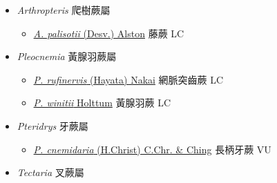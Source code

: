 
  \begin{itemize}
 \item[    ] \textit{Arthropteris} 爬樹蕨屬
                                
  \begin{itemize}
        \item[] \href{http://www.theplantlist.org/tpl1.1/search?q=Arthropteris+palisotii}{\textit{A. palisotii} (Desv.) Alston}   藤蕨   LC
  \end{itemize}
 \item[    ] \textit{Pleocnemia} 黃腺羽蕨屬
                                
  \begin{itemize}
        \item[] \href{http://www.theplantlist.org/tpl1.1/search?q=Pleocnemia+rufinervis}{\textit{P. rufinervis} (Hayata) Nakai}   網脈突齒蕨   LC
        \item[] \href{http://www.theplantlist.org/tpl1.1/search?q=Pleocnemia+winitii}{\textit{P. winitii} Holttum}   黃腺羽蕨   LC
  \end{itemize}
 \item[    ] \textit{Pteridrys} 牙蕨屬
                                
  \begin{itemize}
        \item[] \href{http://www.theplantlist.org/tpl1.1/search?q=Pteridrys+cnemidaria}{\textit{P. cnemidaria} (H.Christ) C.Chr. \& Ching}   長柄牙蕨   VU
  \end{itemize}
 \item[    ] \textit{Tectaria} 叉蕨屬
                                

\end{itemize}
